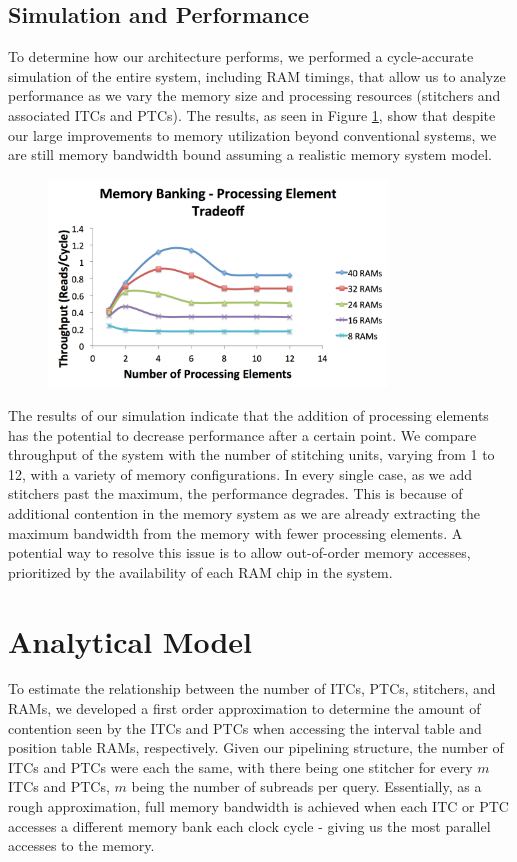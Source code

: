 \documentclass[11pt]{article}
\begin{document}
\subsection{Simulation and Performance}
To determine how our architecture performs, we performed a cycle-accurate simulation of the entire system, including RAM timings, that allow us to analyze performance as we vary the memory size and processing resources (stitchers and associated ITCs and PTCs).  The results, as seen in Figure \ref{utilization}, show that despite our large improvements to memory utilization beyond conventional systems, we are still memory bandwidth bound assuming a realistic memory system model.  
\begin{figure}[ht!]
\centering
\includegraphics[width=90mm]{memproc.png}
\caption{}
\label{utilization}
\end{figure}

The results of our simulation indicate that the addition of processing elements has the potential to decrease performance after a certain point.  We compare throughput of the system with the number of stitching units, varying from 1 to 12, with a variety of memory configurations.  In every single case, as we add stitchers past the maximum, the performance degrades.  This is because of additional contention in the memory system as we are already extracting the maximum bandwidth from the memory with fewer processing elements.  A potential way to resolve this issue is to allow out-of-order memory accesses, prioritized by the availability of each RAM chip in the system.  

\section{Analytical Model}
 
To estimate the relationship between the number of ITCs, PTCs, stitchers, and RAMs, we developed a first order approximation to determine the amount of contention seen by the ITCs and PTCs when accessing the interval table and position table RAMs, respectively. Given our pipelining structure, the number of ITCs and PTCs were each the same, with there being one stitcher for every $m$ ITCs and PTCs, $m$ being the number of subreads per query. Essentially, as a rough approximation, full memory bandwidth is achieved when each ITC or PTC accesses a different memory bank each clock cycle - giving us the most parallel accesses to the memory.
 
\end{document}
